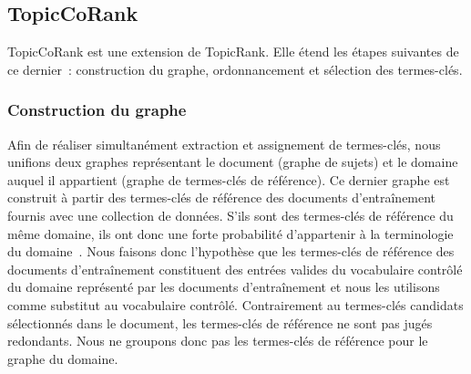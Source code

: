     \subsection{TopicCoRank}
    \label{subsec:main-automatic_keyphrase_annotation-supervised_automatic_keyphrase_annotation-topiccorank}
      TopicCoRank est une extension de TopicRank. Elle étend les étapes
      suivantes de ce dernier~: construction du graphe, ordonnancement et
      sélection des termes-clés.

      \subsubsection{Construction du graphe}
      \label{subsubsec:main-automatic_keyphrase_annotation-supervised_automatic_keyphrase_extraction-topiccorank-graph_construction}
        Afin de réaliser simultanément extraction et assignement de termes-clés,
        nous unifions deux graphes représentant le document (graphe de sujets)
        et le domaine auquel il appartient (graphe de termes-clés de référence).
        Ce dernier graphe est construit à partir des termes-clés de référence
        des documents d'entraînement fournis avec une collection de données.
        S'ils sont des termes-clés de référence du même domaine, ils ont donc
        une forte probabilité d'appartenir à la terminologie du
        domaine~\cite{chaimongkol2013technicaltermextraction}. Nous faisons donc
        l'hypothèse que les termes-clés de référence des documents
        d'entraînement constituent des entrées valides du vocabulaire contrôlé
        du domaine représenté par les documents d'entraînement et nous les
        utilisons comme substitut au vocabulaire contrôlé. Contrairement au
        termes-clés candidats sélectionnés dans le document, les termes-clés de
        référence ne sont pas jugés redondants. Nous ne groupons donc pas les
        termes-clés de référence pour le graphe du domaine.

